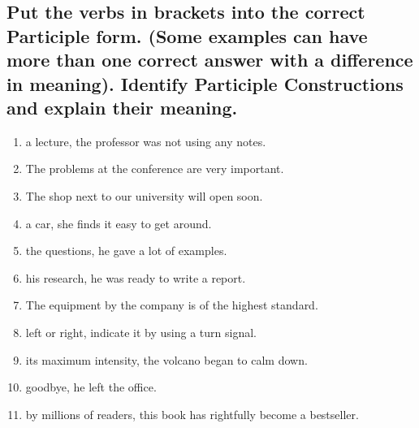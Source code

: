 \subsection*{ Put the verbs in brackets into the correct Participle form. (Some examples can have more
      than one correct answer with a difference in meaning). Identify Participle Constructions and
      explain their meaning.}
\begin{enumerate}
      \item \underline{\hspace{1.5cm}} a lecture, the professor was not using any notes.
      \item The problems \underline{\hspace{1.5cm}} at the conference are very important.
      \item The shop \underline{\hspace{1.5cm}} next to our university will open soon.
      \item \underline{\hspace{1.5cm}} a car, she finds it easy to get around.
      \item \underline{\hspace{1.5cm}} the questions, he gave a lot of examples.
      \item \underline{\hspace{1.5cm}} his research, he was ready to write a report.
      \item The equipment \underline{\hspace{1.5cm}} by the company is of the highest standard.
      \item \underline{\hspace{1.5cm}} left or right, indicate it by using a turn signal.
      \item \underline{\hspace{1.5cm}} its maximum intensity, the volcano began to calm down.
      \item \underline{\hspace{1.5cm}} goodbye, he left the office.
      \item \underline{\hspace{1.5cm}} by millions of readers, this book has rightfully become a bestseller.
\end{enumerate}

